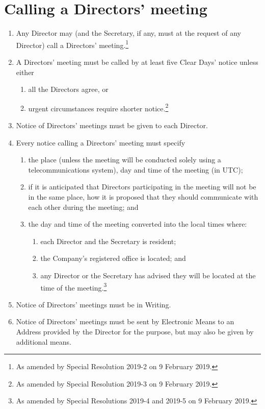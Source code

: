 \documentclass[a4paper,12pt]{article}
\begin{document}
\section{Calling a Directors' meeting}

\begin{enumerate}
  \item Any Director may (and the Secretary, if any, must at the request of any Director) call a Directors' meeting.\footnote{As amended by Special Resolution 2019-2 on 9 February 2019.}
  \item	A Directors' meeting must be called by at least five Clear Days' notice unless either
    \begin{enumerate}
      \item all the Directors agree, or
      \item urgent circumstances require shorter notice.\footnote{As amended by Special Resolution 2019-3 on 9 February 2019.}
    \end{enumerate}
  \item Notice of Directors' meetings must be given to each Director.
  \item Every notice calling a Directors' meeting must specify
    \begin{enumerate}
      \item the place (unless the meeting will be conducted solely using a telecommunications system), day and time of the meeting (in UTC);
      \item if it is anticipated that Directors participating in the meeting will not be in the same place, how it is proposed that they should communicate with each other during the meeting; and
      \item the day and time of the meeting converted into the local times where:
        \begin{enumerate}
          \item each Director and the Secretary is resident;
          \item the Company's registered office is located; and
          \item any Director or the Secretary has advised they will be located at the time of the meeting.\footnote{As amended by Special Resolutions 2019-4 and 2019-5 on 9 February 2019.}
        \end{enumerate}
    \end{enumerate}
  \item Notice of Directors' meetings must be in Writing.
  \item	Notice of Directors' meetings must be sent by Electronic Means to an Address provided by the Director for the purpose, but may also be given by additional means.
\end{enumerate}
\end{document}
